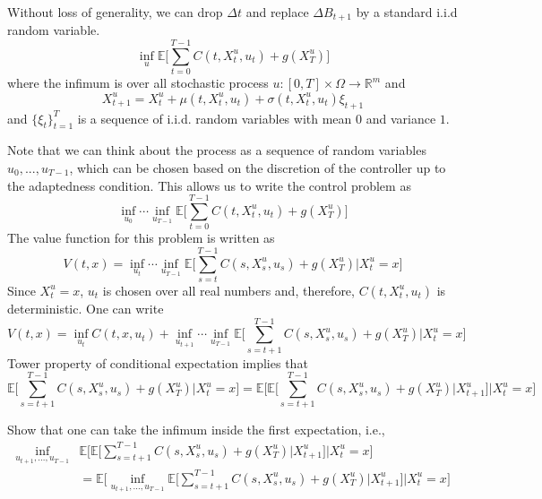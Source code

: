 \documentclass[11pt]{book}
\begin{document}
Without loss of generality, we can drop $\Delta t$ and replace $\Delta B_{t+1}$ by a standard i.i.d random variable.
\begin{equation}\label{prob:discrete_optimal_control}
    \inf_{u} \mathbb{E}\bigg[\sum_{t=0}^{T-1}C(t,X^u_t,u_t)+g(X^u_T)\bigg]
\end{equation}
where the infimum is over all stochastic process $u:[0,T]\times\Omega\to\mathbb{R}^m$ and 
\begin{equation}
    \label{eqn:discrete_state}
    X^u_{t+1} =X^u_t+\mu(t,X^u_t,u_t)+\sigma(t,X^u_t,u_t)\xi_{t+1}
\end{equation}
and $\{\xi_t\}_{t=1}^T$ is a sequence of i.i.d. random variables with mean $0$ and variance $1$.

Note that we can think about the process as a sequence of random variables $u_0,...,u_{T-1}$, which can be chosen based on the discretion of the controller up to the adaptedness condition. This allows us to write the control problem as
\begin{equation}
    \inf_{u_0}\cdots\inf_{u_{T-1}} \mathbb{E}\bigg[\sum_{t=0}^{T-1}C(t,X^u_t,u_t)+g(X^u_T)\bigg]
\end{equation}
The value function for this problem is written as 
\begin{equation}
    V(t,x)= \inf_{u_t}\cdots\inf_{u_{T-1}} \mathbb{E}\bigg[\sum_{s=t}^{T-1}C(s,X^u_s,u_s)+g(X^u_T)\Big| X^u_t=x\bigg]
\end{equation}
Since $X^u_t=x$, $u_t$ is chosen over all real numbers and, therefore, $C(t,X^u_t,u_t)$ is deterministic. One can write
\begin{equation}
    V(t,x)= \inf_{u_t}
    C(t,x,u_t) +\inf_{u_{t+1}}\cdots\inf_{u_{T-1}} \mathbb{E}\bigg[\sum_{s=t+1}^{T-1}C(s,X^u_s,u_s)+g(X^u_T)\Big| X^u_t=x\bigg]
\end{equation}
Tower property of conditional expectation implies that 
\begin{equation}
    \mathbb{E} \bigg[\sum_{s=t+1}^{T-1}C(s,X^u_s,u_s)+g(X^u_T)\Big| X^u_t=x\bigg]= \mathbb{E}\bigg[\mathbb{E}\Big[\sum_{s=t+1}^{T-1}C(s,X^u_s,u_s)+g(X^u_T)\Big|X^u_{t+1}\Big]\Big| X^u_t=x\bigg]
\end{equation}
\begin{ex}
    Show that one can take the infimum inside the first expectation, i.e.,
    \begin{equation}
    \begin{split}
    \inf_{u_{t+1},...,u_{T-1}} &\mathbb{E} \bigg[\mathbb{E}\Big[\sum_{s=t+1}^{T-1}C(s,X^u_s,u_s)+g(X^u_T)\Big|X^u_{t+1}\Big]\Big| X^u_t=x\bigg]\\
    &= \mathbb{E} \bigg[\inf_{u_{t+1},...,u_{T-1}} \mathbb{E}\Big[\sum_{s=t+1}^{T-1} C(s,X^u_s,u_s)+g(X^u_T)\Big|X^u_{t+1}\Big]\Big| X^u_t=x\bigg]
    \end{split}
\end{equation}
\end{ex}
\end{document}
